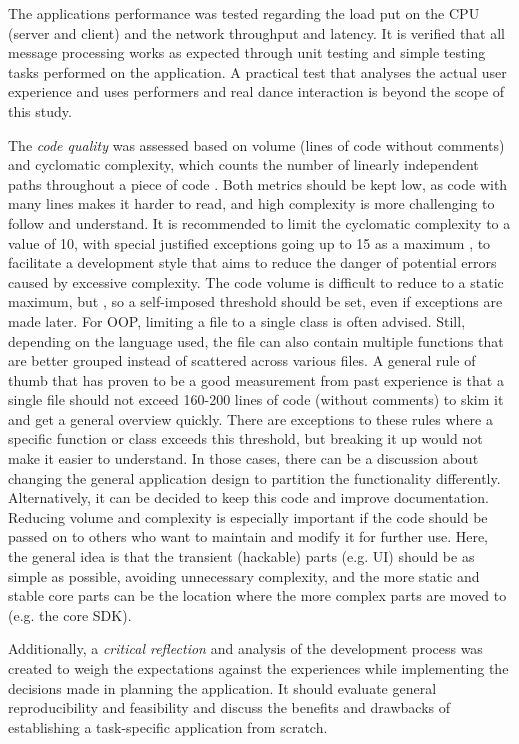 The application\textquotesingle s performance was tested regarding the load put on the \ac{CPU} (server and client) and the network throughput and latency.
It is verified that all message processing works as expected through unit testing and simple testing tasks performed on the application.
A practical test that analyses the actual user experience and uses performers and real dance interaction is beyond the scope of this study.

The \emph{code quality} was assessed based on volume (lines of code without comments) and cyclomatic complexity, which counts the number of linearly independent paths throughout a piece of code \parencite[see][]{mcCabeComplexity}.
Both metrics should be kept low, as code with many lines makes it harder to read, and high complexity is more challenging to follow and understand.
It is recommended to limit the cyclomatic complexity to a value of 10, with special justified exceptions going up to 15 as a maximum \parencite[15]{testingCyclomaticComplexity}, to facilitate a development style that aims to reduce the danger of potential errors caused by excessive complexity.
The code volume is difficult to reduce to a static maximum, but  \parencite[6]{softwareMetricsReliability}, so a self-imposed threshold should be set, even if exceptions are made later.
For \ac{OOP}, limiting a file to a single class is often advised. Still, depending on the language used, the file can also contain multiple functions that are better grouped instead of scattered across various files.
A general rule of thumb that has proven to be a good measurement from past experience is that a single file should not exceed 160-200 lines of code (without comments) to skim it and get a general overview quickly.
There are exceptions to these rules where a specific function or class exceeds this threshold, but breaking it up would not make it easier to understand. In those cases, there can be a discussion about changing the general application design to partition the functionality differently. Alternatively, it can be decided to keep this code and improve documentation.
Reducing volume and complexity is especially important if the code should be passed on to others who want to maintain and modify it for further use. Here, the general idea is that the transient (hackable) parts (e.g. \ac{UI}) should be as simple as possible, avoiding unnecessary complexity, and the more static and stable core parts can be the location where the more complex parts are moved to (e.g. the core \ac{SDK}).

Additionally, a \emph{critical reflection} and analysis of the development process was created to weigh the expectations against the experiences while implementing the decisions made in planning the application.
It should evaluate general reproducibility and feasibility and discuss the benefits and drawbacks of establishing a task-specific application from scratch.
